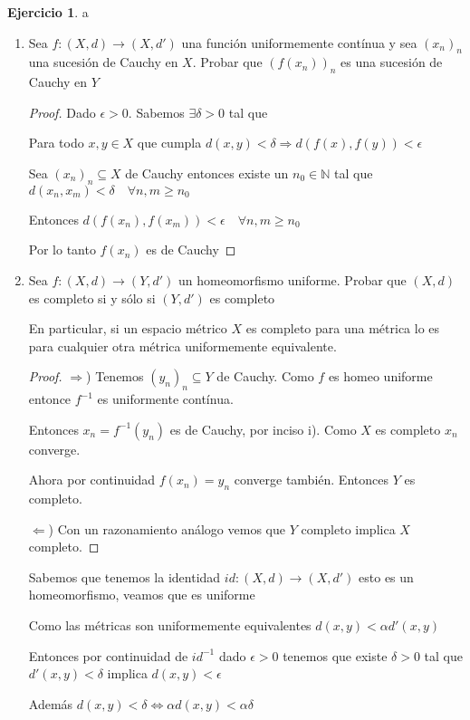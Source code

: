 \documentclass[11pt]{report}
\newcommand{\N}{\mathbb{N}}
\newcommand{\Ra}{\Rightarrow}
\newcommand{\ra}{\rightarrow}
\theoremstyle{definition}
\newtheorem{ej}{Ejercicio}
\begin{document}
	\begin{ej}a
		\begin{enumerate}
			\item Sea $f:(X,d) \ra (X,d')$ una función uniformemente contínua y sea $(x_n)_n$ una sucesión de Cauchy en $X$. Probar que $(f(x_n))_n$ es una sucesión de Cauchy en $Y$
				\begin{proof}
					Dado $\epsilon > 0$. Sabemos $\exists \delta> 0$ tal que 

					Para todo $x,y \in X$ que cumpla $d(x,y) < \delta \Ra d(f(x),f(y))< \epsilon $


					Sea $(x_n)_n \subseteq X$ de Cauchy entonces existe un $n_0 \in \N$ tal que $d(x_n,x_m) < \delta \quad \forall n,m\geq n_0$

					Entonces $d(f(x_n),f(x_m)) < \epsilon \quad \forall n,m \geq n_0$

					Por lo tanto $f(x_n)$ es de Cauchy

				\end{proof}
				
				
			\item Sea $f: (X,d) \ra (Y,d')$ un homeomorfismo uniforme. Probar que $(X,d)$ es completo si y sólo si $(Y,d')$ es completo

			       En particular, si un espacio métrico $X$ es completo para una métrica lo es para cualquier otra métrica uniformemente equivalente.
			       \begin{proof}
				       $\Ra$) Tenemos $(y_n)_n \subseteq Y$ de Cauchy. Como $f$ es homeo uniforme entonce $f^{-1}$ es uniformente contínua.

				Entonces $x_n = f^{-1}(y_n)$ es de Cauchy, por inciso i). Como $X$ es completo $x_n$ converge.

				Ahora por continuidad $f(x_n) = y_n$ converge también. Entonces $Y$ es completo.

				$\Leftarrow $) Con un razonamiento análogo vemos que $Y$ completo implica $X$ completo.

				\end{proof}
					
				Sabemos que tenemos la identidad $id: (X,d) \ra (X,d')$ esto es un homeomorfismo, veamos que es uniforme

				Como las métricas son uniformemente equivalentes $d(x,y) < \alpha d'(x,y)$

				Entonces por continuidad de $id^{-1}$ dado $\epsilon >0 $ tenemos que existe $\delta > 0$ tal que $d'(x,y) < \delta $ implica $d(x,y)< \epsilon$

				Además $ d(x,y) < \delta \iff \alpha d(x,y) < \alpha \delta $
		\end{enumerate}
		
	\end{ej}
	
\end{document}
